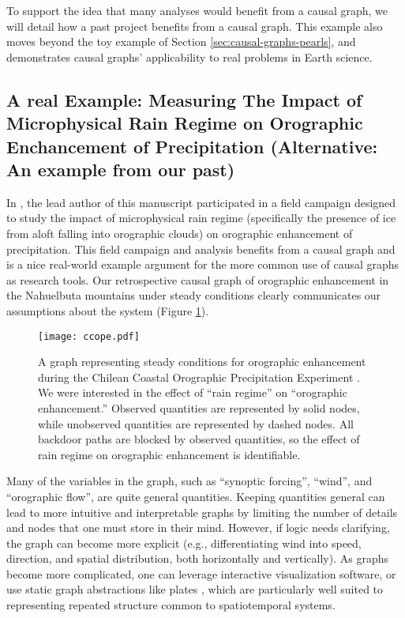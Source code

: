 \documentclass[12pt]{article}
\begin{document}
To support the idea that many analyses would benefit from a causal
graph, we will detail how a past project benefits from a causal
graph. This example also moves beyond the toy example of Section
\ref{sec:causal-graphs-pearls}, and demonstrates causal graphs'
applicability to real problems in Earth science.

\subsection{A real Example: Measuring The Impact of Microphysical Rain
  Regime on Orographic Enchancement of Precipitation (Alternative: An
  example from our past)}

In \citet{massmann2017}, the lead author of this manuscript
participated in a field campaign designed to study the impact of
microphysical rain regime (specifically the presence of ice from aloft
falling into orographic clouds) on orographic enhancement of
precipitation. This field campaign and analysis benefits from a causal
graph and is a nice real-world example argument for the more common
use of causal graphs as research tools. Our retrospective causal graph
of orographic enhancement in the Nahuelbuta mountains under steady
conditions clearly communicates our assumptions about the system
(Figure \ref{fig:ccope}).

\begin{figure} \texttt{[image: ccope.pdf]}
  \caption{A graph representing steady conditions for orographic
    enhancement during the Chilean Coastal Orographic Precipitation
    Experiment \citep[CCOPE,][]{massmann2017}. We were interested in the
    effect of ``rain regime'' on ``orographic enhancement.''  Observed
    quantities are represented by solid nodes, while unobserved quantities
    are represented by dashed nodes. All backdoor paths are blocked by
    observed quantities, so the effect of rain regime on orographic
    enhancement is identifiable.}
  \label{fig:ccope}
\end{figure}

Many of the variables in the graph, such as ``synoptic forcing'',
``wind'', and ``orographic flow'', are quite general
quantities. Keeping quantities general can lead to more intuitive and
interpretable graphs by limiting the number of details and nodes that
one must store in their mind. However, if logic needs clarifying, the
graph can become more explicit (e.g., differentiating wind into speed,
direction, and spatial distribution, both horizontally and
vertically). As graphs become more complicated, one can leverage
interactive visualization software, or use static graph abstractions
like plates \citep{bishop2006pattern}, which are particularly well
suited to representing repeated structure common to spatiotemporal
systems.
\end{document}
